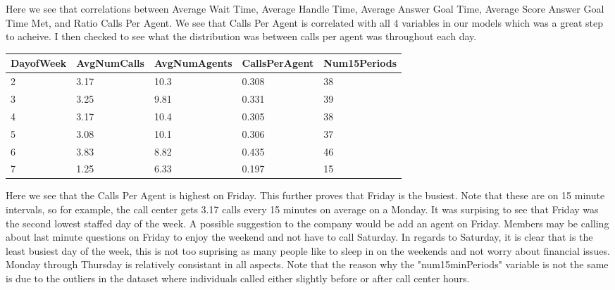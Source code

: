 \documentclass[12pt]{article}
\begin{document}
Here we see that correlations between Average Wait Time, Average Handle Time, Average Answer Goal Time, Average Score Answer Goal Time Met, and Ratio Calls Per Agent.
We see that Calls Per Agent is correlated with all 4 variables in our models which was a great step to acheive. I then checked to see what the distribution was between calls per agent was throughout each day. 
  \begin{table}[H]
    \resizebox{\textwidth}{!} {
    \begin{tabular}{ l | l | l | l | l |}
      {\bf DayofWeek} & {\bf AvgNumCalls} & {\bf AvgNumAgents} & {\bf CallsPerAgent} & {\bf Num15Periods} \\
    \hline
    2 & 3.17 & 10.3 & 0.308 & 38 \\
    \hline
    3 & 3.25 & 9.81 & 0.331 & 39 \\
    \hline
    4 & 3.17 & 10.4 & 0.305 & 38 \\
    \hline
    5 & 3.08 & 10.1 & 0.306 & 37 \\
    \hline
    6 & 3.83 & 8.82 & 0.435 & 46 \\
    \hline
    7 & 1.25 & 6.33  & 0.197 & 15 \\
    \end{tabular}
    }
    \end{table}
Here we see that the Calls Per Agent is highest on Friday. This further proves that Friday is the busiest. Note that these are on 15 minute intervals,
so for example, the call center gets 3.17 calls every 15 minutes on average on a Monday. It was surpising to see that Friday was the second
lowest staffed day of the week. A possible suggestion to the company would be add an agent on Friday. Members may be calling about last minute
questions on Friday to enjoy the weekend and not have to call Saturday. In regards to Saturday, it is clear that is the least busiest day of the week,
this is not too suprising as many people like to sleep in on the weekends and not worry about financial issues. Monday through Thursday is relatively
consistant in all aspects. Note that the reason why the "num15minPeriods" variable is not the same is due to the outliers in the dataset where individuals
called either slightly before or after call center hours.
\end{document}
